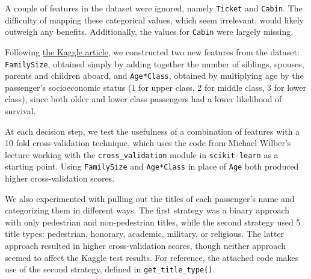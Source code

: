\documentclass[12pt]{report}
\begin{document}
A couple of features in the dataset were ignored, namely \verb+Ticket+ and \verb+Cabin+. The difficulty of mapping these categorical values, which seem irrelevant, would likely outweigh any
benefits. Additionally, the values for \verb+Cabin+ were largely missing.

Following \href{https://www.kaggle.com/c/titanic/details/getting-started-with-python-ii}{the Kaggle article}, we constructed two new features from the dataset:
\verb+FamilySize+, obtained simply by adding together the number of siblings, spouses, parents and children aboard, and \verb+Age*Class+, obtained by multiplying age by the passenger's
socioeconomic status (1 for upper class, 2 for middle class, 3 for lower class), since both older and lower class passengers had a lower likelihood of survival.

At each decision step, we test the usefulness of a combination of features with a 10 fold cross-validation technique, which uses the code from Michael Wilber's lecture working with the \verb+cross_validation+
module in \verb+scikit-learn+ as a starting point.
Using \verb+FamilySize+ and \verb+Age*Class+ in place of \verb+Age+ both produced higher cross-validation scores.

We also experimented with pulling out the titles of each passenger's name and categorizing them in different ways. The first strategy was a binary approach with only pedestrian and non-pedestrian titles,
while the second strategy used 5 title types: pedestrian, honorary, academic, military, or religious. The latter approach resulted in higher cross-validation scores, though neither approach seemed to affect the Kaggle test results.
For reference, the attached code makes use of the second strategy, defined in \verb+get_title_type()+.
\end{document}
